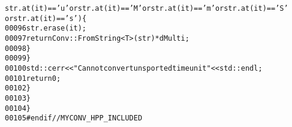 \begin{footnotesize}
\begin{alltt}
       str.at(it) == \textcolor{charliteral}{'u'} or str.at(it) == \textcolor{charliteral}{'M'} or str.at(it) == \textcolor{charliteral}{'m'} or str.at(it) == \textcolor{charliteral}{'S'
      } or str.at(it) == \textcolor{charliteral}{'s'})\{
00096                     str.erase(it);
00097                     \textcolor{keywordflow}{return} Conv::FromString<T>(str) * dMulti;
00098                 \}
00099             \}
00100             std::cerr<<\textcolor{stringliteral}{"Cannot convert unsported time unit"}<<std::endl;
00101             \textcolor{keywordflow}{return} 0;
00102         \}
00103     \}
00104 \}
00105 \textcolor{preprocessor}{#endif // MYCONV\_HPP\_INCLUDED}
\end{alltt}\end{footnotesize}
